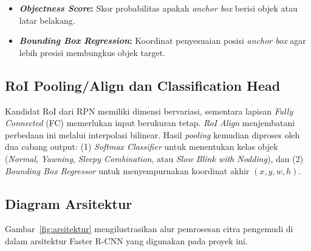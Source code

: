 \documentclass[11pt,a4paper,oneside]{report}
\begin{document}
\begin{itemize}[leftmargin=*]
    \item \textbf{\textit{Objectness Score}:} Skor probabilitas apakah \textit{anchor box} berisi objek atau latar belakang.
    \item \textbf{\textit{Bounding Box Regression}:} Koordinat penyesuaian posisi \textit{anchor box} agar lebih presisi membungkus objek target.
\end{itemize}

\subsection{RoI Pooling/Align dan Classification Head}

Kandidat RoI dari RPN memiliki dimensi bervariasi, sementara lapisan \textit{Fully Connected} (FC) memerlukan input berukuran tetap. \textit{RoI Align} menjembatani perbedaan ini melalui interpolasi bilinear. Hasil \textit{pooling} kemudian diproses oleh dua cabang output: (1) \textit{Softmax Classifier} untuk menentukan kelas objek (\textit{Normal}, \textit{Yawning}, \textit{Sleepy Combination}, atau \textit{Slow Blink with Nodding}), dan (2) \textit{Bounding Box Regressor} untuk menyempurnakan koordinat akhir $(x, y, w, h)$.

\subsection{Diagram Arsitektur}

Gambar~\ref{fig:arsitektur} mengilustrasikan alur pemrosesan citra pengemudi di dalam arsitektur Faster R-CNN yang digunakan pada proyek ini.
\end{document}
